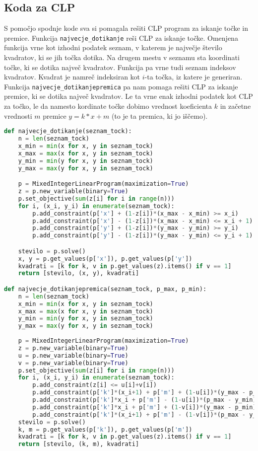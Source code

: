 \documentclass[a4paper]{article}
\begin{document}
\subsection{Koda za CLP }

S pomočjo spodnje kode sva si pomagala rešiti CLP program za iskanje točke in premice. Funkcija \texttt{najvecje\_dotikanje} reši CLP za iskanje točke. Omenjena funkcija vrne kot izhodni podatek seznam, v katerem je največje število kvadratov, ki se jih točka dotika. Na drugem mestu v seznamu sta koordinati točke, ki se dotika največ kvadratov. Funkcija pa vrne tudi seznam indeksov kvadratov. Kvadrat je namreč indeksiran kot $i$-ta točka, iz katere je generiran. Funkcija \texttt{najvecje\_dotikanjepremica} pa nam pomaga rešiti CLP za iskanje premice, ki se dotika največ kvadratov. Le ta vrne enak izhodni podatek kot CLP za točko, le da namesto kordinate točke dobimo vrednost koeficienta $k$ in začetne vrednosti $m$ premice $y = k*x + m$ (to je ta premica, ki jo iščemo).

\begin{lstlisting}[language=Python]
def najvecje_dotikanje(seznam_tock):
    n = len(seznam_tock)
    x_min = min(x for x, y in seznam_tock)
    x_max = max(x for x, y in seznam_tock)
    y_min = min(y for x, y in seznam_tock)
    y_max = max(y for x, y in seznam_tock)

    p = MixedIntegerLinearProgram(maximization=True)
    z = p.new_variable(binary=True) 
    p.set_objective(sum(z[i] for i in range(n))) 
    for i, (x_i, y_i) in enumerate(seznam_tock): 
        p.add_constraint(p['x'] + (1-z[i])*(x_max - x_min) >= x_i)
        p.add_constraint(p['x'] - (1-z[i])*(x_max - x_min) <= x_i + 1)
        p.add_constraint(p['y'] + (1-z[i])*(y_max - y_min) >= y_i)
        p.add_constraint(p['y'] - (1-z[i])*(y_max - y_min) <= y_i + 1)

    stevilo = p.solve()
    x, y = p.get_values(p['x']), p.get_values(p['y'])
    kvadrati = [k for k, v in p.get_values(z).items() if v == 1]
    return [stevilo, (x, y), kvadrati] 

def najvecje_dotikanjepremica(seznam_tock, p_max, p_min): 
    n = len(seznam_tock)
    x_min = min(x for x, y in seznam_tock)
    x_max = max(x for x, y in seznam_tock)
    y_min = min(y for x, y in seznam_tock)
    y_max = max(y for x, y in seznam_tock)
   
    p = MixedIntegerLinearProgram(maximization=True) 
    z = p.new_variable(binary=True) 
    u = p.new_variable(binary=True)
    v = p.new_variable(binary=True)
    p.set_objective(sum(z[i] for i in range(n))) 
    for i, (x_i, y_i) in enumerate(seznam_tock): 
        p.add_constraint(z[i] <= u[i]+v[i])
        p.add_constraint(p['k']*(x_i+1) + p['m'] + (1-u[i])*(y_max - p_min) >= y_i)
        p.add_constraint(p['k']*x_i + p['m'] - (1-u[i])*(p_max - y_min) <= y_i + 1)
        p.add_constraint(p['k']*x_i + p['m'] + (1-v[i])*(y_max - p_min) >= y_i)
        p.add_constraint(p['k']*(x_i+1) + p['m'] - (1-v[i])*(p_max - y_min) <= y_i + 1)
    stevilo = p.solve()
    k, m = p.get_values(p['k']), p.get_values(p['m'])
    kvadrati = [k for k, v in p.get_values(z).items() if v == 1]
    return [stevilo, (k, m), kvadrati] 
\end{lstlisting}
\end{document}
